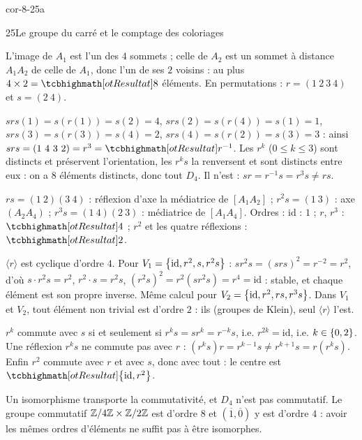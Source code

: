 
\begin{blocLivre}{cor-8-25a}
\begin{corrige}{25}{Le groupe du carré et le comptage des coloriages}
\begin{questions}
  \item L'image de $A_1$ est l'un des $4$ sommets ; celle de $A_2$ est un
    sommet à distance $A_1A_2$ de celle de $A_1$, donc l'un de ses $2$
    voisins : au plus $4\times2=\res{8}$ éléments. En permutations :
    $r=(1\ 2\ 3\ 4)$ et $s=(2\ 4)$.
  \item $srs(1)=s(r(1))=s(2)=4$, $srs(2)=s(r(4))=s(1)=1$,
    $srs(3)=s(r(3))=s(4)=2$, $srs(4)=s(r(2))=s(3)=3$ : ainsi
    $srs=(1\ 4\ 3\ 2)=r^{3}=\res{r^{-1}}$. Les $r^{k}$ ($0\leqslant k\leqslant3$)
    sont distincts et préservent l'orientation, les $r^{k}s$ la renversent
    et sont distincts entre eux : on a $8$ éléments distincts, donc tout
    $D_4$. Il n'est  : $sr=r^{-1}s=r^{3}s\neq rs$.
  \item $rs=(1\ 2)(3\ 4)$ : réflexion d'axe la médiatrice de
    $[A_1A_2]$ ; $r^{2}s=(1\ 3)$ : axe $(A_2A_4)$ ;
    $r^{3}s=(1\ 4)(2\ 3)$ : médiatrice de $[A_1A_4]$. Ordres :
    $\mathrm{id}$ : $1$ ; $r$, $r^{3}$ : $\res{4}$ ; $r^{2}$ et les
    quatre réflexions : $\res{2}$.
\end{questions}
\begin{questions}[resume]
  \item $\langle r\rangle$ est cyclique d'ordre $4$. Pour
    $V_1=\left\{\mathrm{id},r^{2},s,r^{2}s\right\}$ : $sr^{2}s=(srs)^{2}=r^{-2}=r^{2}$,
    d'où $s\cdot r^{2}s=r^{2}$, $r^{2}\cdot s=r^{2}s$,
    $(r^{2}s)^{2}=r^{2}(sr^{2}s)=r^{4}=\mathrm{id}$ : stable, et chaque
    élément est son propre inverse. Même calcul pour
    $V_2=\left\{\mathrm{id},r^{2},rs,r^{3}s\right\}$. Dans $V_1$ et $V_2$, tout
    élément non trivial est d'ordre $2$ : ils  (groupes de Klein), seul $\langle r\rangle$ l'est.
  \item $r^{k}$ commute avec $s$ si et seulement si
    $r^{k}s=sr^{k}=r^{-k}s$, i.e. $r^{2k}=\mathrm{id}$, i.e. $k\in\left\{0,2\right\}$.
    Une réflexion $r^{k}s$ ne commute pas avec $r$ :
    $(r^{k}s)r=r^{k-1}s\neq r^{k+1}s=r(r^{k}s)$. Enfin $r^{2}$ commute
    avec $r$ et avec $s$, donc avec tout : le centre est
    $\res{\ens{\mathrm{id},r^{2}}}$.
  \item Un isomorphisme transporte la commutativité, et $D_4$ n'est pas
    commutatif. Le groupe commutatif $\mathbb{Z}/4\mathbb{Z}\times\mathbb{Z}/2\mathbb{Z}$ est d'ordre $8$
    et $(\overline1,\overline0)$ y est d'ordre $4$ : avoir les mêmes
    ordres d'éléments ne suffit pas à être isomorphes.
\end{questions}
\end{corrige}
\end{blocLivre}

